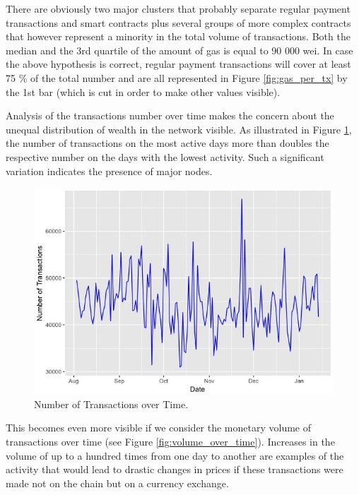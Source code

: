 There are obviously two major clusters that probably separate regular payment transactions and smart contracts plus several groups of more complex contracts that however represent a minority in the total volume of transactions. 
Both the median and the 3rd quartile of the amount of gas is equal to 90 000 wei. In case the above hypothesis is correct, regular payment transactions will cover at least 75 \% of the total number and are all represented in Figure \ref{fig:gas_per_tx} by the 1st bar (which is cut in order to make other values visible).

Analysis of the transactions number over time makes the concern about the unequal distribution of wealth in the network visible. 
As illustrated in Figure \ref{fig:tx_over_time}, the number of transactions on the most active days more than doubles the respective number on the days with the lowest activity. 
Such a significant variation indicates the presence of major nodes.  

\begin{figure}[h]
  \centering
  \includegraphics[width=\linewidth]{figures/tx_over_time.jpeg}
  \caption{Number of Transactions over Time.}
  \label{fig:tx_over_time}
\end{figure}

This becomes even more visible if we consider the monetary volume of transactions over time (see Figure \ref{fig:volume_over_time}).
Increases in the volume of up to a hundred times from one day to another are examples of the activity that would lead to drastic changes in prices if these transactions were made not on the chain but on a currency exchange.

